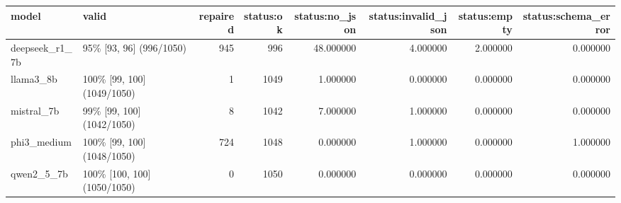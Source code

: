 \begin{tabular}{llrrrrrr}
\toprule
model & valid & repaired & status:ok & status:no\_json & status:invalid\_json & status:empty & status:schema\_error \\
\midrule
deepseek\_r1\_7b & 95\% [93, 96] (996/1050) & 945 & 996 & 48.000000 & 4.000000 & 2.000000 & 0.000000 \\
llama3\_8b & 100\% [99, 100] (1049/1050) & 1 & 1049 & 1.000000 & 0.000000 & 0.000000 & 0.000000 \\
mistral\_7b & 99\% [99, 100] (1042/1050) & 8 & 1042 & 7.000000 & 1.000000 & 0.000000 & 0.000000 \\
phi3\_medium & 100\% [99, 100] (1048/1050) & 724 & 1048 & 0.000000 & 1.000000 & 0.000000 & 1.000000 \\
qwen2\_5\_7b & 100\% [100, 100] (1050/1050) & 0 & 1050 & 0.000000 & 0.000000 & 0.000000 & 0.000000 \\
\bottomrule
\end{tabular}
